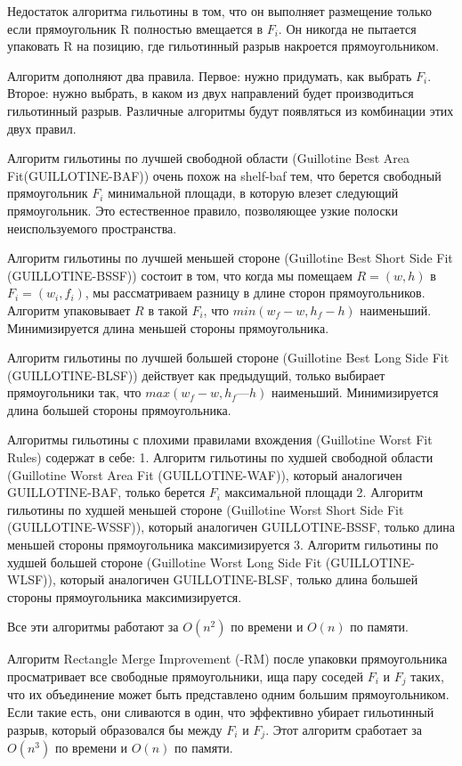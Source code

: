 \documentclass[a4paper,12pt]{report}
\theoremstyle{remark}
\begin{document}
Недостаток алгоритма гильотины в том, что он выполняет размещение только если прямоугольник R полностью вмещается в $F_i$. Он никогда не пытается упаковать R на позицию, где гильотинный разрыв накроется прямоугольником.

Алгоритм дополняют два правила. Первое: нужно придумать, как выбрать $F_i$. Второе: нужно выбрать, в каком из двух направлений будет производиться гильотинный разрыв. Различные алгоритмы будут появляться из комбинации этих двух правил.

Алгоритм гильотины по лучшей свободной области (Guillotine Best Area Fit\newline (GUILLOTINE-BAF)) очень похож на shelf-baf тем, что берется свободный прямоугольник $F_i$ минимальной площади, в которую влезет следующий прямоугольник. Это естественное правило, позволяющее узкие полоски неиспользуемого пространства.

Алгоритм гильотины по лучшей меньшей стороне (Guillotine Best Short Side Fit (GUILLOTINE-BSSF)) состоит в том, что когда мы помещаем $R = (w, h)$ в $F_i = (w_i, f_i)$, мы рассматриваем разницу в длине сторон прямоугольников. Алгоритм упаковывает $R$ в такой $F_i$, что $min(w_f - w, h_f - h)$ наименьший. Минимизируется длина меньшей стороны прямоугольника.

Алгоритм гильотины по лучшей большей стороне (Guillotine Best Long Side Fit (GUILLOTINE-BLSF)) действует как предыдущий, только выбирает прямоугольники так, что $max(w_f - w, h_f — h)$ наименьший. Минимизируется длина большей стороны прямоугольника.

Алгоритмы гильотины с плохими правилами вхождения (Guillotine Worst Fit Rules) содержат в себе:
1. Алгоритм гильотины по худшей свободной области (Guillotine Worst Area Fit (GUILLOTINE-WAF)), который аналогичен GUILLOTINE-BAF, только берется $F_i$ максимальной площади
2. Алгоритм гильотины по худшей меньшей стороне (Guillotine Worst Short Side Fit (GUILLOTINE-WSSF)), который аналогичен GUILLOTINE-BSSF, только длина меньшей стороны прямоугольника  максимизируется
3. Алгоритм гильотины по худшей большей стороне (Guillotine Worst Long Side Fit (GUILLOTINE-WLSF)), который аналогичен GUILLOTINE-BLSF, только длина большей стороны прямоугольника максимизируется.

Все эти алгоритмы работают за $O(n^2)$ по времени и $O(n)$ по памяти.

Алгоритм Rectangle Merge Improvement (-RM) после упаковки прямоугольника просматривает все свободные прямоугольники, ища пару соседей $F_i$ и $F_j$ таких, что их объединение может быть представлено одним большим прямоугольником. Если такие есть, они сливаются в один, что эффективно убирает гильотинный разрыв, который образовался бы между $F_i$ и $F_j$. Этот алгоритм сработает за $O(n^3)$ по времени и $O(n)$ по памяти. 
\end{document}
